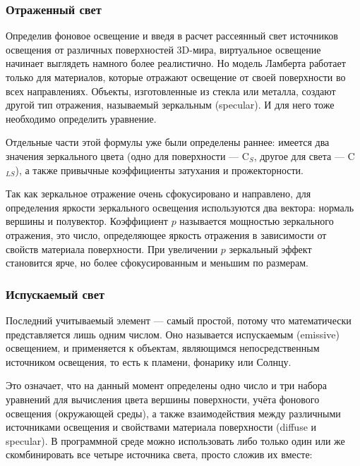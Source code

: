 \subsubsection{Отраженный свет}

Определив фоновое освещение и введя в расчет рассеянный свет источников освещения от различных поверхностей 3D-мира, виртуальное освещение начинает выглядеть намного более реалистично. Но модель Ламберта работает только для материалов, которые отражают освещение от своей поверхности во всех направлениях. Объекты, изготовленные из стекла или металла, создают другой тип отражения, называемый зеркальным (specular). И для него тоже необходимо определить уравнение.

\begin{figure}[H]
\end{figure}

Отдельные части этой формулы уже были определены раннее: имеется два значения зеркального цвета (одно для поверхности — C$_{S}$, другое для света — C$_{LS}$), а также привычные коэффициенты затухания и прожекторности.

Так как зеркальное отражение очень сфокусировано и направлено, для определения яркости зеркального освещения используются два вектора: нормаль вершины и полувектор. Коэффициент $p$ называется мощностью зеркального отражения, это число, определяющее яркость отражения в зависимости от свойств материала поверхности. При увеличении $p$ зеркальный эффект становится ярче, но более сфокусированным и меньшим по размерам.

\subsubsection{Испускаемый свет}

Последний учитываемый элемент — самый простой, потому что математически представляется лишь одним числом. Оно называется испускаемым (emissive) освещением, и применяется к объектам, являющимся непосредственным источником освещения, то есть к пламени, фонарику или Солнцу.

Это означает, что на данный момент определены одно число и три набора уравнений для вычисления цвета вершины поверхности, учёта фонового освещения (окружающей среды), а также взаимодействия между различными источниками освещения и свойствами материала поверхности (diffuse и specular). В программной среде можно использовать либо только один или же скомбинировать все четыре источника света, просто сложив их вместе:
\begin{figure}[H]
\end{figure}

